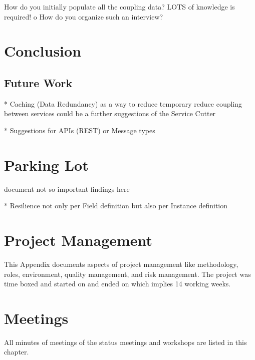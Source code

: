 \documentclass[hsr-ba,english]{hgbthesis}
\begin{document}
How do you initially populate all the coupling data? LOTS of knowledge is required!
o   How do you organize such an interview?

\chapter{Conclusion}


\section{Future Work}

* Caching (Data Redundancy) as a way to reduce temporary reduce coupling between services could be a further suggestions of the Service Cutter

* Suggestions for APIs (REST) or Message types 


\appendix



\chapter{Parking Lot}
document not so important findings here	

* Resilience not only per Field definition but also per Instance definition 


\chapter{Project Management}
\label{cha:projectmgmt}

This Appendix documents aspects of project management like methodology, roles, environment, quality management, and risk management. The project was time boxed and started on  and ended on  which implies 14 working weeks. 






\chapter{Meetings}

All minutes of meetings of the status meetings and workshops are listed in
this chapter.




%
%


%



\printglossaries


\MakeBibliography
\end{document}
